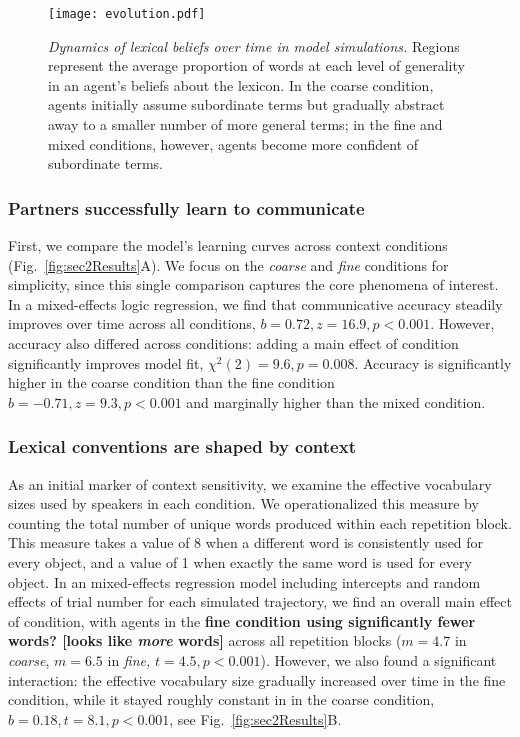 \begin{figure}[h]
\begin{center}
\texttt{[image: evolution.pdf]}
\caption{\emph{Dynamics of lexical beliefs over time in model simulations.} Regions represent the average proportion of words at each level of generality in an agent's beliefs about the lexicon. In the coarse condition, agents initially assume subordinate terms but gradually abstract away to a smaller number of more general terms; in the fine and mixed conditions, however, agents become more confident of subordinate terms.}
\label{fig:evolution}
\end{center}
\end{figure}

\subsubsection{Partners successfully learn to communicate}

First, we compare the model's learning curves across context conditions (Fig.~\ref{fig:sec2Results}A). 
We focus on the \emph{coarse} and \emph{fine} conditions for simplicity, since this single comparison captures the core phenomena of interest.
In a mixed-effects logic regression, we find that communicative accuracy steadily improves over time across all conditions, $b=0.72, z = 16.9, p<0.001$.
However, accuracy also differed across conditions: adding a main effect of condition significantly improves model fit, $\chi^2(2) = 9.6, p = 0.008$. 
Accuracy is significantly higher in the coarse condition than the fine condition $b=-0.71, z=9.3, p <0.001$ and marginally higher than the mixed condition.

\subsubsection{Lexical conventions are shaped by context}

As an initial marker of context sensitivity, we examine the effective vocabulary sizes used by speakers in each condition.
We operationalized this measure by counting the total number of unique words produced within each repetition block.
This measure takes a value of 8 when a different word is consistently used for every object, and a value of 1 when exactly the same word is used for every object.
In an mixed-effects regression model including intercepts and random effects of trial number for each simulated trajectory, we find an overall main effect of condition, with agents in the \textbf{fine condition using significantly fewer words? [looks like \textit{more} words]} across all repetition blocks ($m = 4.7$ in \emph{coarse}, $m=6.5$ in \emph{fine,} $t = 4.5, p < 0.001$).
However, we also found a significant interaction: the effective vocabulary size gradually increased over time in the fine condition, while it stayed roughly constant in in the coarse condition, $b = 0.18, t = 8.1, p < 0.001$, see Fig.~\ref{fig:sec2Results}B.

